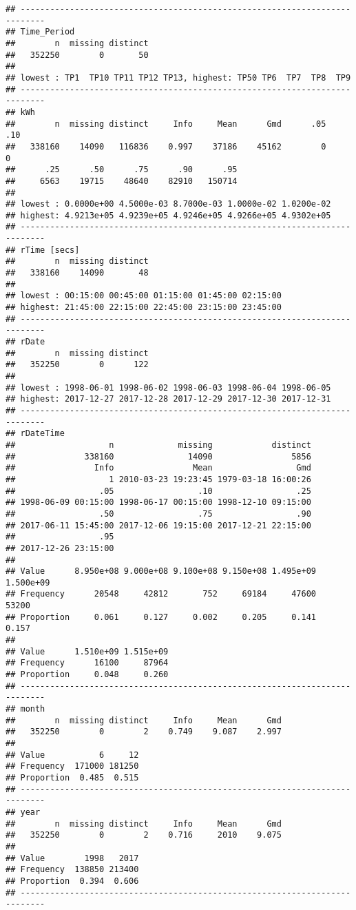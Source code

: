 \documentclass[]{article}
\theoremstyle{definition}
\theoremstyle{definition}
\theoremstyle{definition}
\theoremstyle{remark}
\begin{document}
\begin{verbatim}
## ---------------------------------------------------------------------------
## Time_Period 
##        n  missing distinct 
##   352250        0       50 
## 
## lowest : TP1  TP10 TP11 TP12 TP13, highest: TP50 TP6  TP7  TP8  TP9 
## ---------------------------------------------------------------------------
## kWh 
##        n  missing distinct     Info     Mean      Gmd      .05      .10 
##   338160    14090   116836    0.997    37186    45162        0        0 
##      .25      .50      .75      .90      .95 
##     6563    19715    48640    82910   150714 
## 
## lowest : 0.0000e+00 4.5000e-03 8.7000e-03 1.0000e-02 1.0200e-02
## highest: 4.9213e+05 4.9239e+05 4.9246e+05 4.9266e+05 4.9302e+05
## ---------------------------------------------------------------------------
## rTime [secs] 
##        n  missing distinct 
##   338160    14090       48 
## 
## lowest : 00:15:00 00:45:00 01:15:00 01:45:00 02:15:00
## highest: 21:45:00 22:15:00 22:45:00 23:15:00 23:45:00
## ---------------------------------------------------------------------------
## rDate 
##        n  missing distinct 
##   352250        0      122 
## 
## lowest : 1998-06-01 1998-06-02 1998-06-03 1998-06-04 1998-06-05
## highest: 2017-12-27 2017-12-28 2017-12-29 2017-12-30 2017-12-31
## ---------------------------------------------------------------------------
## rDateTime 
##                   n             missing            distinct 
##              338160               14090                5856 
##                Info                Mean                 Gmd 
##                   1 2010-03-23 19:23:45 1979-03-18 16:00:26 
##                 .05                 .10                 .25 
## 1998-06-09 00:15:00 1998-06-17 00:15:00 1998-12-10 09:15:00 
##                 .50                 .75                 .90 
## 2017-06-11 15:45:00 2017-12-06 19:15:00 2017-12-21 22:15:00 
##                 .95 
## 2017-12-26 23:15:00 
##                                                                       
## Value      8.950e+08 9.000e+08 9.100e+08 9.150e+08 1.495e+09 1.500e+09
## Frequency      20548     42812       752     69184     47600     53200
## Proportion     0.061     0.127     0.002     0.205     0.141     0.157
##                               
## Value      1.510e+09 1.515e+09
## Frequency      16100     87964
## Proportion     0.048     0.260
## ---------------------------------------------------------------------------
## month 
##        n  missing distinct     Info     Mean      Gmd 
##   352250        0        2    0.749    9.087    2.997 
##                         
## Value           6     12
## Frequency  171000 181250
## Proportion  0.485  0.515
## ---------------------------------------------------------------------------
## year 
##        n  missing distinct     Info     Mean      Gmd 
##   352250        0        2    0.716     2010    9.075 
##                         
## Value        1998   2017
## Frequency  138850 213400
## Proportion  0.394  0.606
## ---------------------------------------------------------------------------
\end{verbatim}
\end{document}
